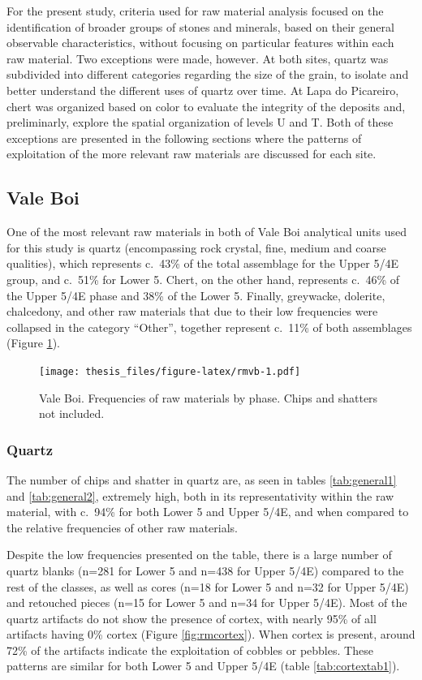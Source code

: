 \documentclass[12pt,twoside]{reedthesis}
\begin{document}
For the present study, criteria used for raw material analysis focused on the identification of broader groups of stones and minerals, based on their general observable characteristics, without focusing on particular features within each raw material. Two exceptions were made, however. At both sites, quartz was subdivided into different categories regarding the size of the grain, to isolate and better understand the different uses of quartz over time. At Lapa do Picareiro, chert was organized based on color to evaluate the integrity of the deposits and, preliminarly, explore the spatial organization of levels U and T. Both of these exceptions are presented in the following sections where the patterns of exploitation of the more relevant raw materials are discussed for each site.

\hypertarget{vale-boi-3}{%
\subsection{Vale Boi}\label{vale-boi-3}}

One of the most relevant raw materials in both of Vale Boi analytical units used for this study is quartz (encompassing rock crystal, fine, medium and coarse qualities), which represents c.~43\% of the total assemblage for the Upper 5/4E group, and c.~51\% for Lower 5. Chert, on the other hand, represents c.~46\% of the Upper 5/4E phase and 38\% of the Lower 5. Finally, greywacke, dolerite, chalcedony, and other raw materials that due to their low frequencies were collapsed in the category ``Other'', together represent c.~11\% of both assemblages (Figure \ref{fig:rmvb}).
\begin{figure}
\centering
\texttt{[image: thesis\_files/figure-latex/rmvb-1.pdf]}
\caption{\label{fig:rmvb}Vale Boi. Frequencies of raw materials by phase. Chips and shatters not included.}
\end{figure}
\hypertarget{quartz}{%
\subsubsection{Quartz}\label{quartz}}

The number of chips and shatter in quartz are, as seen in tables \ref{tab:general1} and \ref{tab:general2}, extremely high, both in its representativity within the raw material, with c.~94\% for both Lower 5 and Upper 5/4E, and when compared to the relative frequencies of other raw materials.

Despite the low frequencies presented on the table, there is a large number of quartz blanks (n=281 for Lower 5 and n=438 for Upper 5/4E) compared to the rest of the classes, as well as cores (n=18 for Lower 5 and n=32 for Upper 5/4E) and retouched pieces (n=15 for Lower 5 and n=34 for Upper 5/4E).
Most of the quartz artifacts do not show the presence of cortex, with nearly 95\% of all artifacts having 0\% cortex (Figure \ref{fig:rmcortex}). When cortex is present, around 72\% of the artifacts indicate the exploitation of cobbles or pebbles. These patterns are similar for both Lower 5 and Upper 5/4E (table \ref{tab:cortextab1}).
\end{document}

